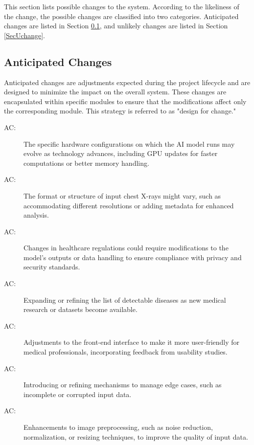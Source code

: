 \documentclass[12pt, titlepage]{article}
\newcounter{acnum}
\newcommand{\actheacnum}{AC\theacnum}
\begin{document}
This section lists possible changes to the system. According to the likeliness
of the change, the possible changes are classified into two
categories. Anticipated changes are listed in Section \ref{SecAchange}, and
unlikely changes are listed in Section \ref{SecUchange}.

\subsection{Anticipated Changes} \label{SecAchange}

Anticipated changes are adjustments expected during the project lifecycle and are designed to minimize the impact on the overall system. These changes are encapsulated within specific modules to ensure that the modifications affect only the corresponding module. This strategy is referred to as "design for change."

\begin{description}
\item[ \actheacnum \label{acHardware}:] The specific hardware configurations on which the AI model runs may evolve as technology advances, including GPU updates for faster computations or better memory handling.

\item[ \actheacnum \label{acInput}:] The format or structure of input chest X-rays might vary, such as accommodating different resolutions or adding metadata for enhanced analysis.

\item[ \actheacnum \label{acCompliance}:] Changes in healthcare regulations could require modifications to the model’s outputs or data handling to ensure compliance with privacy and security standards.

\item[ \actheacnum \label{acDisease}:] Expanding or refining the list of detectable diseases as new medical research or datasets become available.

\item[ \actheacnum \label{acUI}:] Adjustments to the front-end interface to make it more user-friendly for medical professionals, incorporating feedback from usability studies.

\item[ \actheacnum \label{acErrorHandling}:] Introducing or refining mechanisms to manage edge cases, such as incomplete or corrupted input data.

\item[ \actheacnum \label{acPreprocessing}:] Enhancements to image preprocessing, such as noise reduction, normalization, or resizing techniques, to improve the quality of input data.

\end{description}
\end{document}
